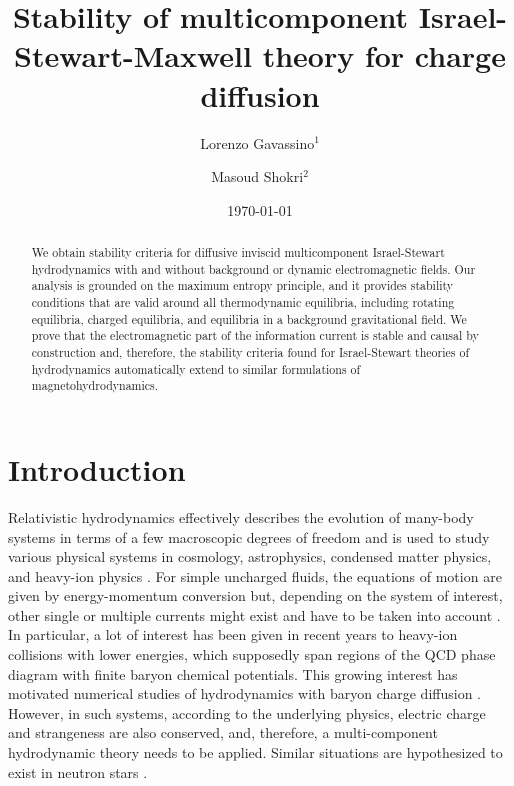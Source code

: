 \documentclass[
a4paper,
amsfonts,
amsmath,
reprint,
showkeys,
nofootinbib,
twoside,
onecolumn,
notitlepage
]{revtex4-1}
\begin{document}
	
	\title{Stability of multicomponent Israel-Stewart-Maxwell theory for charge diffusion}
	\author{ Lorenzo Gavassino$^1$}
	\author{Masoud Shokri$^2$}
	\date{\today}
	
	\begin{abstract}
		We obtain stability criteria for diffusive inviscid multicomponent Israel-Stewart hydrodynamics with and without background or dynamic electromagnetic fields. Our analysis is grounded on the maximum entropy principle, and it provides stability conditions that are valid around all thermodynamic equilibria, including rotating equilibria, charged equilibria, and equilibria in a background gravitational field.
		We prove that the electromagnetic part of the information current is stable and causal by construction and, therefore, the stability criteria found for Israel-Stewart theories of hydrodynamics automatically extend to similar formulations of magnetohydrodynamics.
	\end{abstract} 
	
	\maketitle
	
	\section{Introduction}
	\label{sec:intro}
Relativistic hydrodynamics effectively describes the evolution of many-body systems in terms of a few macroscopic degrees of freedom and is used to study various physical systems in cosmology, astrophysics, condensed matter physics, and heavy-ion physics \cite{rezzolla_book,denicol_rischke_2022,andersson2007review,FlorkowskiReview2018}. 
	For simple uncharged fluids, the equations of motion are given by energy-momentum conversion but, depending on the system of interest, other single or multiple currents might exist and have to be taken into account \cite{Landry2020}. 
	In particular, a lot of interest has been given in recent years to heavy-ion collisions with lower energies, which supposedly span regions of the QCD phase diagram with finite baryon chemical potentials. 
	This growing interest has motivated numerical studies of hydrodynamics with baryon charge diffusion \cite{Denicol:2018rbw, Du:2019obx}. 
	However, in such systems, according to the underlying physics, electric charge and strangeness are also conserved, and, therefore, a multi-component hydrodynamic theory needs to be applied.
	Similar situations are hypothesized to exist in neutron stars \cite{andersson_comer2000,prix2004,sourie_glitch2017,Geo2020}.  
	
\end{document}
